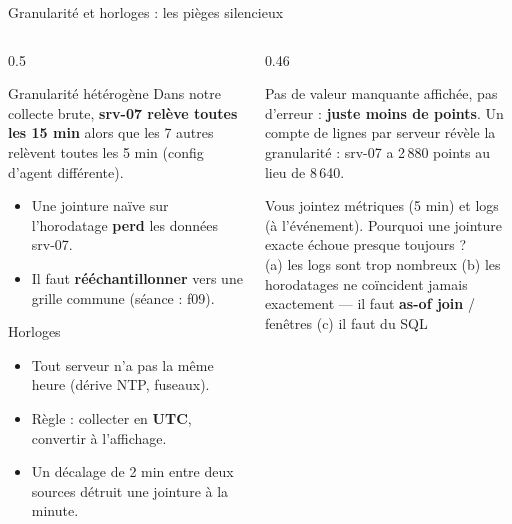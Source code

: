 \begin{frame}{Granularité et horloges : les pièges silencieux}
\begin{columns}[t]
\begin{column}{0.5\textwidth}
\begin{block}{Granularité hétérogène}
Dans notre collecte brute, \textbf{srv-07 relève toutes les 15 min} alors
que les 7 autres relèvent toutes les 5 min (config d'agent différente).
\begin{itemize}
\item Une jointure naïve sur l'horodatage \textbf{perd} les données srv-07.
\item Il faut \textbf{rééchantillonner} vers une grille commune (séance : f09).
\end{itemize}
\end{block}
\begin{block}{Horloges}
\begin{itemize}
\item Tout serveur n'a pas la même heure (dérive NTP, fuseaux).
\item Règle : collecter en \textbf{UTC}, convertir à l'affichage.
\item Un décalage de 2 min entre deux sources détruit une jointure à la minute.
\end{itemize}
\end{block}
\end{column}
\begin{column}{0.46\textwidth}
\begin{wbox}
Pas de valeur manquante affichée, pas d'erreur : \textbf{juste moins de
points}. Un compte de lignes par serveur révèle la granularité :
srv-07 a 2\,880 points au lieu de 8\,640.
\end{wbox}
\begin{qbox}[Question]
Vous jointez métriques (5 min) et logs (à l'événement). Pourquoi une
jointure  exacte échoue presque toujours ?\\
(a) les logs sont trop nombreux \quad (b) les horodatages ne coïncident
jamais exactement --- il faut \textbf{as-of join} / fenêtres \quad
(c) il faut du SQL
\end{qbox}
\end{column}
\end{columns}
\end{frame}

